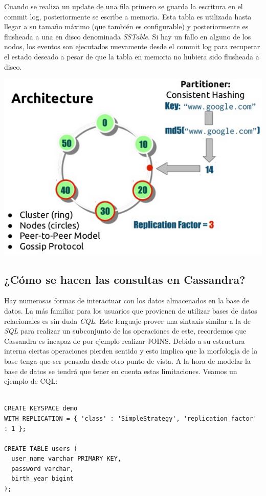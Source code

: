 \documentclass[11pt,a4paper]{article}
\begin{document}
Cuando se realiza un update de una fila primero se guarda la escritura en el commit log, posteriormente se escribe a memoria. Esta tabla es utilizada hasta llegar a su tamaño máximo (que también es configurable) y posteriormente es flusheada a una en disco denominada \textit{SSTable}. Si hay un fallo en alguno de los nodos, los eventos son ejecutados nuevamente desde el commit log para recuperar el estado deseado a pesar de que la tabla en memoria no hubiera sido flusheada a disco. \\

\centerline{\includegraphics[scale=0.5]{imagenes/cassandra-ring-2}}

\subsection{¿Cómo se hacen las consultas en Cassandra?}

Hay numerosas formas de interactuar con los datos almacenados en la base de datos. La más familiar para los usuarios que provienen de utilizar bases de datos relacionales es sin duda \textit{CQL}. Este lenguaje provee una sintaxis similar a la de \textit{SQL} para realizar un subconjunto de las operaciones de este, recordemos que Cassandra es incapaz de por ejemplo realizar JOINS. Debido a su estructura interna ciertas operaciones pierden sentido y esto implica que la morfología de la base tenga que ser pensada desde otro punto de vista. A la hora de modelar la base de datos se tendrá que tener en cuenta estas limitaciones. Veamos un ejemplo de CQL:

\begin{lstlisting}

CREATE KEYSPACE demo
WITH REPLICATION = { 'class' : 'SimpleStrategy', 'replication_factor' : 1 };

CREATE TABLE users (
  user_name varchar PRIMARY KEY,
  password varchar,
  birth_year bigint
);
 \end{lstlisting}
\end{document}
